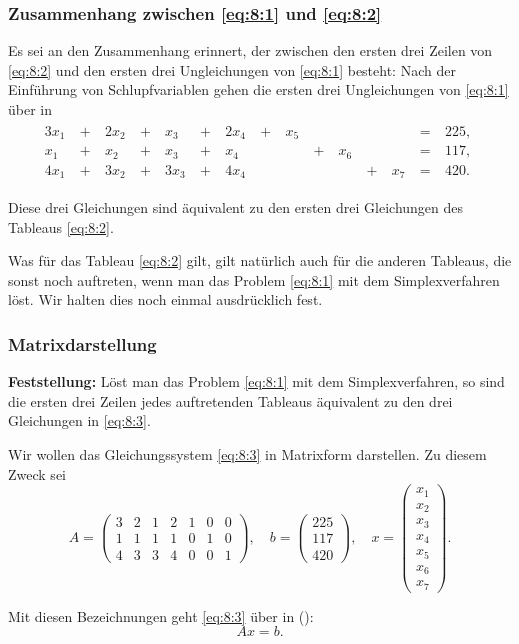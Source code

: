 \documentclass[smaller]{beamer}
\begin{document}
\begin{frame}
 \frametitle{Zusammenhang zwischen \eqref{eq:8:1} und \eqref{eq:8:2}}
  Es sei an den Zusammenhang erinnert, der zwischen den ersten drei Zeilen von \eqref{eq:8:2} und den ersten drei Ungleichungen von \eqref{eq:8:1} besteht: Nach der Einführung von Schlupfvariablen gehen die ersten drei Ungleichungen von \eqref{eq:8:1} über in
\begin{align}
\begin{alignedat}{8}
\label{eq:8:3}
3x_1 &\ + &\ 2x_2 &\ + &\  x_3 &\ + &\ 2x_4 &\ + &\ x_5 &\   &\     &\   &\     &\ = &\ 225,\ \\
 x_1 &\ + &\  x_2 &\ + &\  x_3 &\ + &\  x_4 &\   &\     &\ + &\ x_6 &\   &\     &\ = &\ 117,\ \\
4x_1 &\ + &\ 3x_2 &\ + &\ 3x_3 &\ + &\ 4x_4 &\   &\     &\   &\     &\ + &\ x_7 &\ = &\ 420.\
\end{alignedat}
\end{align}

\alert{Diese drei Gleichungen sind äquivalent zu den ersten drei Gleichungen des Tableaus \eqref{eq:8:2}.} \\ \vspace*{0.2cm}

Was für das Tableau \eqref{eq:8:2} gilt, gilt natürlich auch für die anderen Tableaus, die sonst noch auftreten, wenn man das Problem \eqref{eq:8:1} mit dem Simplexverfahren löst. Wir halten dies noch einmal ausdrücklich fest.
\end{frame}

\begin{frame}
 \frametitle{Matrixdarstellung}
 \textbf{Feststellung:} Löst man das Problem \eqref{eq:8:1} mit dem Simplexverfahren, so sind die ersten drei Zeilen jedes auftretenden Tableaus äquivalent zu den drei Gleichungen in \eqref{eq:8:3}. \\ \vspace*{0.2cm}

Wir wollen das Gleichungssystem \eqref{eq:8:3} in \alert{Matrixform} darstellen. Zu diesem Zweck sei
\[
A = \begin{pmatrix} 3 & 2 & 1 & 2 & 1 & 0 & 0 \\ 1 & 1 & 1 & 1 & 0 & 1 & 0 \\ 4 & 3 & 3 & 4 & 0 & 0 & 1 \end{pmatrix}, \quad
b = \begin{pmatrix} 225 \\ 117 \\ 420 \end{pmatrix}, \quad
x = \begin{pmatrix} x_1 \\ x_2 \\ x_3 \\ x_4 \\x_5 \\ x_6 \\ x_7 \end{pmatrix}.
\]

Mit diesen Bezeichnungen geht \eqref{eq:8:3} über in ():
\[
Ax = b.
\]
\end{frame}
\end{document}
